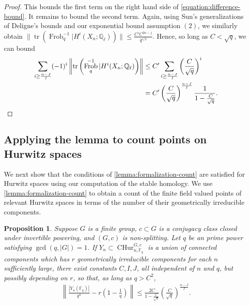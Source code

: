 \documentclass[12 pt]{amsart}
\theoremstyle{plain}
\newtheorem{proposition}[theorem]{Proposition}
\theoremstyle{definition}
\theoremstyle{remark}
\numberwithin{equation}{section}
\DeclareMathOperator\tr{tr}
\DeclareMathOperator\frob{Frob}
\newcommand{\cphur}[4]{\operatorname{CHur}^{#1, #3}_{#2, #4}}
\begin{document}
\begin{proof}
	This bounds the first term on the right hand side of \eqref{equation:difference-bound}. It remains to bound the second
	term.
	Again, using Sun's generalizations of Deligne's bounds and our
	exponential bound assumption
	$(2)$, we similarly obtain
	$\|\tr (\frob_q^{-1} | H^i (X_n; \mathbb Q_{\ell})) \| \leq
	\frac{C'C^{2n-j}}{q^{i/2}}$.
	Hence, so long as $C < \sqrt{q}$, we can bound
	\begin{align*}
\sum_{i \geq \frac{n-J}{I}} (-1)^i \left \| \tr \left(
				\frob_q^{-1} | H^i(X_n; \mathbb Q_{\ell})
			\right) \right \|
		&\leq C' \sum_{i \geq \frac{n-J}{I}}
		\left(\frac{C}{\sqrt q}\right)^{i}
		\\
		&= C' \left(
		\frac{C}{\sqrt{q}}\right)^{\frac{n-J}{I}}
		\frac{1}{1- \frac{C}{\sqrt{q}}}.\qedhere
	\end{align*}
\end{proof}

\subsection{Applying the lemma to count points on Hurwitz spaces}

We next show that the conditions of \autoref{lemma:formalization-count} are
satisfied for Hurwitz spaces using our computation of the stable homology.
We
use \autoref{lemma:formalization-count} to obtain a count of the finite field
valued points of relevant Hurwitz spaces in terms of the number of their
geometrically irreducible components.

\begin{proposition}
	\label{proposition:hurwitz-space-point-count}
	Suppose $G$ is a finite group, $c \subset G$ is a conjugacy class closed
	under invertible powering, and
	$(G,c)$ is non-splitting.
	Let $q$ be an prime power satisfying $\gcd(q, |G|) = 1$.
If $Y_n \subset \cphur G n c {\mathbb F_q}$ is a union of connected components which has $r$
		geometrically irreducible components for each $n$ sufficiently
		large, 
		there exist constants $C, I, J$, all independent of
		$n$ and $q$, but possibly depending on $r$, so that, as long as
		$q > C^2$,
	\begin{align}
		\label{equation:subset-components-govern-count}
		\left \|  \frac{\left|Y_n(\mathbb
		F_q)\right|}{q^n} -
		r \left(1 -
		\frac{1}{q}\right)
		\right \| \leq 
		\frac{2C}{1- \frac{C}{\sqrt{q}}}
		\left(\frac{C}{\sqrt{q}}\right)^{\frac{n-J}{I}}.
	\end{align}
\end{proposition}
\end{document}
